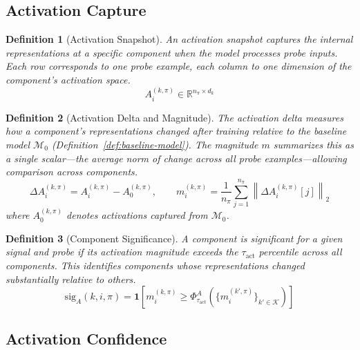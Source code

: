\documentclass[11pt]{article}
\newtheorem{definition}{Definition}[section]
\begin{document}
\subsection{Activation Capture}
\label{sec:activation-capture}

\begin{definition}[Activation Snapshot]
\label{def:activation-snapshot}
An activation snapshot captures the internal representations at a specific component when the model processes probe inputs. Each row corresponds to one probe example, each column to one dimension of the component's activation space.
\begin{equation}
A^{(k,\pi)}_i \in \mathbb{R}^{n_\pi \times d_k}
\end{equation}
\end{definition}

\begin{definition}[Activation Delta and Magnitude]
\label{def:activation-delta-and-magnitude}
The activation delta measures how a component's representations changed after training relative to the baseline model $\mathcal{M}_0$ (Definition~\ref{def:baseline-model}). The magnitude $m$ summarizes this as a single scalar---the average norm of change across all probe examples---allowing comparison across components.
\begin{equation}
\Delta A^{(k,\pi)}_i = A^{(k,\pi)}_i - A^{(k,\pi)}_0, \qquad m^{(k,\pi)}_i = \frac{1}{n_\pi} \sum_{j=1}^{n_\pi} \left\|\Delta A^{(k,\pi)}_i[j]\right\|_2
\end{equation}
where $A^{(k,\pi)}_0$ denotes activations captured from $\mathcal{M}_0$.
\end{definition}

\begin{definition}[Component Significance]
\label{def:component-significance}
A component is significant for a given signal and probe if its activation magnitude exceeds the $\tau_{\text{act}}$ percentile across all components. This identifies components whose representations changed substantially relative to others.
\begin{equation}
\text{sig}_A(k, i, \pi) = \mathbf{1}\left[m^{(k,\pi)}_i \geq \Phi^A_{\tau_{\text{act}}}\left(\{m^{(k',\pi)}_i\}_{k' \in \mathcal{K}}\right)\right]
\end{equation}
\end{definition}

\subsection{Activation Confidence}
\label{sec:activation-confidence}
\end{document}
